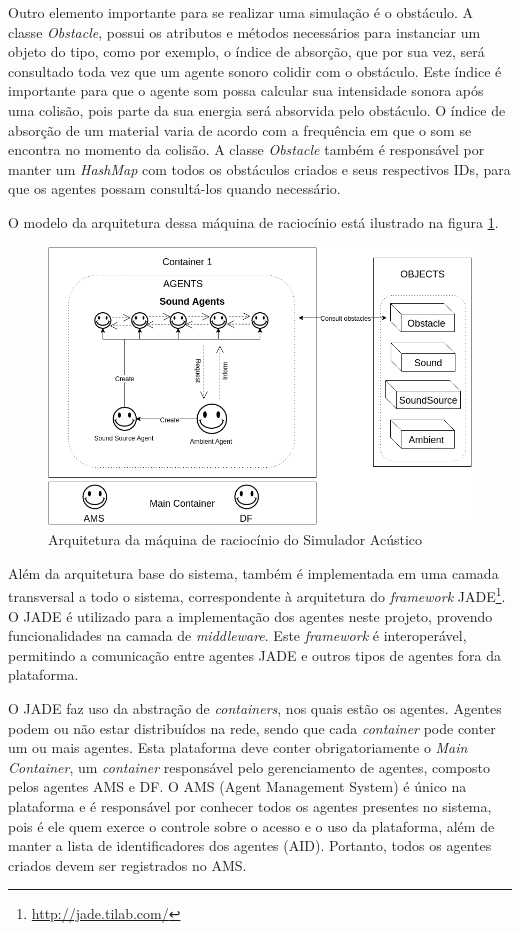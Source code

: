 Outro elemento importante para se realizar uma simulação é o obstáculo. A classe \textit{Obstacle}, possui os atributos e métodos necessários para instanciar um objeto do tipo, como por exemplo, o índice de absorção, que por sua vez, será consultado toda vez que um agente sonoro colidir com o obstáculo. Este índice é importante para que o agente som possa calcular sua intensidade sonora após uma colisão, pois parte da sua energia será absorvida pelo obstáculo. O índice de absorção de um material varia de acordo com a frequência em que o som se encontra no momento da colisão. A classe \textit{Obstacle} também é responsável por manter um \textit{HashMap} com todos os obstáculos criados e seus respectivos IDs, para que os agentes possam consultá-los quando necessário.

O modelo da arquitetura dessa máquina de raciocínio está ilustrado na figura \ref{arquitetura}.

\begin{figure}[!htb]
\centering
\includegraphics[scale=0.4]{figuras/arquitetura}
\caption{Arquitetura da máquina de raciocínio do Simulador Acústico}
\label{arquitetura}
\end{figure}

Além da arquitetura base do sistema, também é implementada em uma camada transversal a todo o sistema, correspondente à arquitetura do \textit{framework} JADE\footnote{\url{http://jade.tilab.com/}}. O JADE é utilizado para a implementação dos agentes neste projeto, provendo funcionalidades na camada de \textit{middleware}. Este \textit{framework} é interoperável, permitindo a comunicação entre agentes JADE e outros tipos de agentes fora da plataforma. 

O JADE faz uso da abstração de \textit{containers}, nos quais estão os agentes. Agentes podem ou não estar distribuídos na rede, sendo que cada \textit{container} pode conter um ou mais agentes. Esta plataforma deve conter obrigatoriamente o \textit{Main Container}, um \textit{container} responsável pelo gerenciamento de agentes, composto pelos agentes AMS e DF. O AMS (Agent Management System) é único na plataforma e é responsável por conhecer todos os agentes presentes no sistema, pois é ele quem exerce o controle sobre o acesso e o uso da plataforma, além de manter  a lista de identificadores dos agentes (AID). Portanto, todos os agentes criados devem ser registrados no AMS. 


